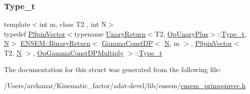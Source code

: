 \subsubsection{\texorpdfstring{Type\_t}{Type\_t}\hspace{0.1cm}{\footnotesize\ttfamily [3/3]}}
{\footnotesize\ttfamily template$<$int m, class T2 , int N$>$ \\
typedef \mbox{\hyperlink{classENSEM_1_1PSpinVector}{P\+Spin\+Vector}}$<$typename \mbox{\hyperlink{structENSEM_1_1UnaryReturn}{Unary\+Return}}$<$T2, \mbox{\hyperlink{structENSEM_1_1OpUnaryPlus}{Op\+Unary\+Plus}}$>$\+::\mbox{\hyperlink{structENSEM_1_1BinaryReturn_3_01GammaConstDP_3_01N_00_01m_01_4_00_01PSpinVector_3_01T2_00_01N_01c511155a335117739782ed7ccba11d26_a52e82a21673455547a782fa36aea725d}{Type\+\_\+t}}, \mbox{\hyperlink{adat__devel_2lib_2hadron_2operator__name__util_8cc_a7722c8ecbb62d99aee7ce68b1752f337}{N}}$>$ \mbox{\hyperlink{structENSEM_1_1BinaryReturn}{E\+N\+S\+E\+M\+::\+Binary\+Return}}$<$ \mbox{\hyperlink{classENSEM_1_1GammaConstDP}{Gamma\+Const\+DP}}$<$ \mbox{\hyperlink{adat__devel_2lib_2hadron_2operator__name__util_8cc_a7722c8ecbb62d99aee7ce68b1752f337}{N}}, m $>$, \mbox{\hyperlink{classENSEM_1_1PSpinVector}{P\+Spin\+Vector}}$<$ T2, \mbox{\hyperlink{adat__devel_2lib_2hadron_2operator__name__util_8cc_a7722c8ecbb62d99aee7ce68b1752f337}{N}} $>$, \mbox{\hyperlink{structENSEM_1_1OpGammaConstDPMultiply}{Op\+Gamma\+Const\+D\+P\+Multiply}} $>$\+::\mbox{\hyperlink{structENSEM_1_1BinaryReturn_3_01GammaConstDP_3_01N_00_01m_01_4_00_01PSpinVector_3_01T2_00_01N_01c511155a335117739782ed7ccba11d26_a52e82a21673455547a782fa36aea725d}{Type\+\_\+t}}}



The documentation for this struct was generated from the following file\+:\begin{DoxyCompactItemize}
\item 
/\+Users/archanar/\+Kinematic\+\_\+factor/adat-\/devel/lib/ensem/\mbox{\hyperlink{adat-devel_2lib_2ensem_2ensem__primspinvec_8h}{ensem\+\_\+primspinvec.\+h}}\end{DoxyCompactItemize}

